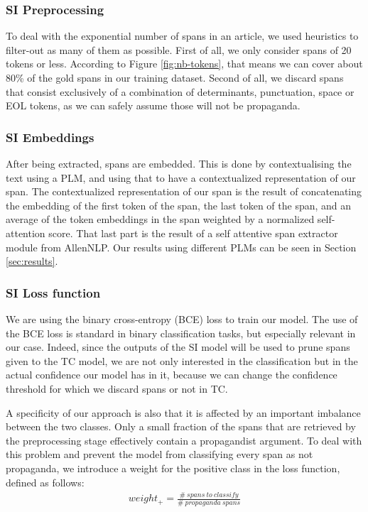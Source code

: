 \documentclass[11pt]{article}
\newcommand{\pol}[1]{{\fontfamily{pcr}\selectfont#1}}
\begin{document}
\subsubsection{\pol{SI} Preprocessing}  \label{sec:si:preprocesing}
To deal with the exponential number of spans in an article, we used heuristics to filter-out as many of them as possible. First of all, we only consider spans of 20 tokens or less. According to Figure \ref{fig:nb-tokens}, that means we can cover about 80\% of the gold spans in our training dataset. Second of all, we discard spans that consist exclusively of a combination of determinants, punctuation, space or \pol{EOL} tokens, as we can safely assume those will not be propaganda.


\subsubsection{\pol{SI} Embeddings} \label{sec:si:embedding}
After being extracted, spans are embedded. This is done by contextualising the text using a \pol{PLM}, and using that to have a contextualized representation of our span. The contextualized representation of our span is the result of concatenating the embedding of the first token of the span, the last token of the span, and an average of the token embeddings in the span weighted by a normalized self-attention score. That last part is the result of a self attentive span extractor module from \pol{AllenNLP}. Our results using different \pol{PLM}s can be seen in Section \ref{sec:results}. 

\subsubsection{\pol{SI} Loss function}
We are using the binary cross-entropy (BCE) loss to train our model. The use of the BCE loss is standard in binary classification tasks, but especially relevant in our case. Indeed, since the outputs of the \pol{SI} model will be used to prune spans given to the \pol{TC} model, we are not only interested in the classification but in the actual confidence our model has in it, because we can change the confidence threshold for which we discard spans or not in \pol{TC}. 

A specificity of our approach is also that it is affected by an important imbalance between the two classes. Only a small fraction of the spans that are retrieved by the preprocessing stage effectively contain a propagandist argument. To deal with this problem and prevent the model from classifying every span as not propaganda, we introduce a weight for the positive class in the loss function, defined as follows:
\begin{align*}
    weight_{+} = \frac{\#\ spans\ to\ classify}{\#\ propaganda\ spans}
\end{align*}
\end{document}
